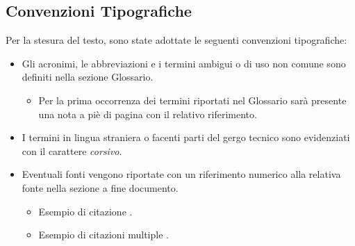 \subsection{Convenzioni Tipografiche}
Per la stesura del testo, sono state adottate le seguenti convenzioni tipografiche:
\begin{itemize}
    \item Gli acronimi, le abbreviazioni e i termini ambigui o di uso non comune sono definiti nella sezione Glossario.
    \begin{itemize} 
        \item Per la prima occorrenza dei termini riportati nel Glossario sarà presente una nota a piè di pagina con il relativo riferimento.
    \end{itemize}
	\item I termini in lingua straniera o facenti parti del gergo tecnico sono evidenziati con il carattere \emph{corsivo}.
	\item Eventuali fonti vengono riportate con un riferimento numerico alla relativa fonte nella sezione a fine documento.
	\begin{itemize} 
        \item Esempio di citazione \cite{site:agile-manifesto}.
        \item Esempio di citazioni multiple \cite{site:agile-manifesto,womak:lean-thinking}.
    \end{itemize}
\end{itemize}
